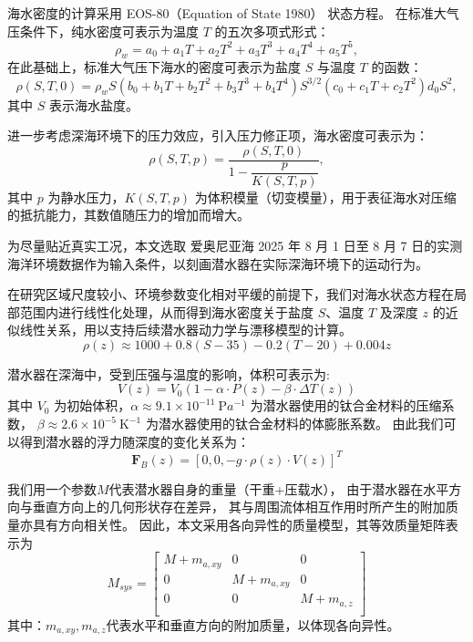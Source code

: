 \documentclass{mcmthesis}
\begin{document}
海水密度的计算采用 EOS-80（Equation of State 1980） 状态方程。
在标准大气压条件下，纯水密度可表示为温度 $T$ 的五次多项式形式：
\begin{equation}
\rho_w = a_0 + a_1 T + a_2 T^2 + a_3 T^3 + a_4 T^4 + a_5 T^5 ,
\end{equation}
在此基础上，标准大气压下海水的密度可表示为盐度 $S$ 与温度 $T$ 的函数：
\begin{equation}
\rho(S,T,0)=\rho _w
S \left( b_0 + b_1 T + b_2 T^2 + b_3 T^3 + b_4 T^4 \right)
S^{3/2} \left( c_0 + c_1 T + c_2 T^2 \right)
d_0 S^2 ,
\end{equation}
其中 $S$ 表示海水盐度。

进一步考虑深海环境下的压力效应，引入压力修正项，海水密度可表示为：
\begin{equation}
\rho(S,T,p)=\frac{\rho(S,T,0)}{1-\dfrac{p}{K(S,T,p)}} ,
\end{equation}
其中 $p$ 为静水压力，$K(S,T,p)$ 为体积模量（切变模量），用于表征海水对压缩的抵抗能力，其数值随压力的增加而增大。

为尽量贴近真实工况，本文选取 爱奥尼亚海 2025 年 8 月 1 日至 8 月 7 日的实测海洋环境数据作为输入条件，以刻画潜水器在实际深海环境下的运动行为。

在研究区域尺度较小、环境参数变化相对平缓的前提下，我们对海水状态方程在局部范围内进行线性化处理，从而得到海水密度关于盐度 $S$、温度 $T$ 及深度 $z$ 的近似线性关系，用以支持后续潜水器动力学与漂移模型的计算。
\begin{equation}
  \rho(z)\approx1000+0.8(S-35)-0.2(T-20)+0.004z
\end{equation}

潜水器在深海中，受到压强与温度的影响，体积可表示为:
\begin{equation}
  V(z)=V_0(1-\alpha\cdot P(z)-\beta\cdot\Delta T(z))
\end{equation}
 其中 $V_0$ 为初始体积，$\alpha\approx9.1\times10^{-11}\mathrm{\ P}a^{-1}$ 为潜水器使用的钛合金材料的压缩系数，
$\beta\approx2.6\times10^{-5}\mathrm{\ K}^{-1}$ 为潜水器使用的钛合金材料的体膨胀系数。
由此我们可以得到潜水器的浮力随深度的变化关系为：
\begin{equation}
  \bm{F}_{B}({z})=[0,0,-g⋅ρ(z)⋅V(z)]^T
\end{equation}

我们用一个参数$M$代表潜水器自身的重量（干重+压载水），
由于潜水器在水平方向与垂直方向上的几何形状存在差异，
其与周围流体相互作用时所产生的附加质量亦具有方向相关性。
因此，本文采用各向异性的质量模型，其等效质量矩阵表示为
\begin{equation}
  M_{sys}=[\begin{matrix}M+m_{a,xy}&0&0\\0&M+m_{a,xy}&0\\0&0&M+m_{a,z}\\\end{matrix}]
\end{equation}
其中：$m_{a,xy},m_{a,z}$代表水平和垂直方向的附加质量，以体现各向异性。
\end{document}
